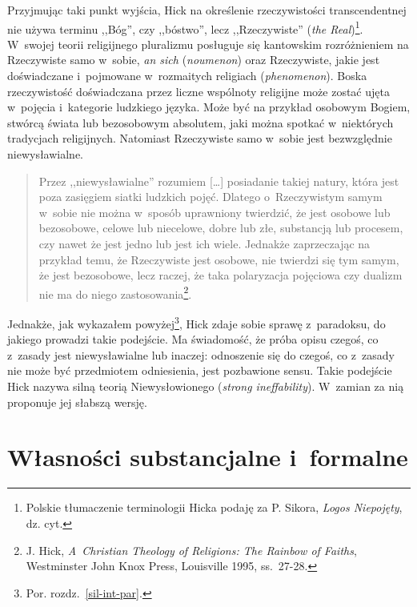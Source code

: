 Przyjmując taki punkt wyjścia, Hick na określenie rzeczywistości transcendentnej nie używa terminu ,,Bóg'', czy ,,bóstwo'', lecz ,,Rzeczywiste'' (\textit{the Real})\footnote{Polskie tłumaczenie terminologii Hicka podaję za P. Sikora, \textit{Logos Niepojęty}, dz. cyt.}. W~swojej teorii religijnego pluralizmu posługuje się kantowskim rozróżnieniem na Rzeczywiste samo w~sobie, \textit{an sich} (\textit{noumenon}) oraz Rzeczywiste, jakie jest doświadczane i~pojmowane w~rozmaitych religiach (\textit{phenomenon}). Boska rzeczywistość doświadczana przez liczne wspólnoty religijne może zostać ujęta w~pojęcia i~kategorie ludzkiego języka. Może być na przykład osobowym Bogiem, stwórcą świata lub bezosobowym absolutem, jaki można spotkać w~niektórych tradycjach religijnych. Natomiast Rzeczywiste samo w~sobie jest bezwzględnie niewysławialne.

\begin{quote}
Przez ,,niewysławialne'' rozumiem [\ldots] posiadanie takiej natury, która jest poza zasięgiem siatki ludzkich pojęć. Dlatego o~Rzeczywistym samym w~sobie nie można w~sposób uprawniony twierdzić, że jest osobowe lub bezosobowe, celowe lub niecelowe, dobre lub złe, substancją lub procesem, czy nawet że jest jedno lub jest ich wiele. Jednakże zaprzeczając na przykład temu, że Rzeczywiste jest osobowe, nie twierdzi się tym samym, że jest bezosobowe, lecz raczej, że taka polaryzacja pojęciowa czy dualizm nie ma do niego zastosowania\footnote{J. Hick, \textit{A~Christian Theology of Religions: The Rainbow of Faiths}, Westminster John Knox Press, Louisville 1995, ss.~27-28.}.
\end{quote}

Jednakże, jak wykazałem powyżej\footnote{Por. rozdz.~\ref{sil-int-par}.}, Hick zdaje sobie sprawę z~paradoksu, do jakiego prowadzi takie podejście. Ma świadomość, że próba opisu czegoś, co z~zasady jest niewysławialne lub inaczej: odnoszenie się do czegoś, co z~zasady nie może być przedmiotem odniesienia, jest pozbawione sensu. Takie podejście Hick nazywa silną teorią Niewysłowionego (\textit{strong ineffability}). W~zamian za nią proponuje jej słabszą wersję.


\section{Własności substancjalne i~formalne}

